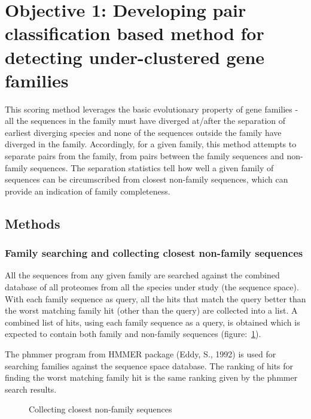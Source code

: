 \documentclass{article}
\begin{document}
	\section{Objective 1: Developing pair classification based method for detecting under-clustered gene families} 
	This scoring method leverages the basic evolutionary property of gene families - all the sequences in the family must have diverged at/after the separation of earliest diverging species and none of the sequences outside the family have diverged in the family. Accordingly, for a given family, this method attempts to separate pairs from the family, from pairs between the family sequences and non-family sequences. The separation statistics tell how well a given family of sequences can be circumscribed from closest non-family sequences, which can provide an indication of family completeness.
		\subsection{Methods}
			\subsubsection{Family searching and collecting closest non-family sequences}
			All the sequences from any given family are searched against the combined database of all proteomes from all the species under study (the sequence space). With each family sequence as query, all the hits that match the query better than the worst matching family hit (other than the query) are collected into a list. A combined list of hits, using each family sequence as a query, is obtained which is expected to contain both family and non-family sequences (figure:~\ref{fig:collecting_non_fam_seqs}).
			
			The phmmer program from HMMER package (Eddy, S., 1992) is used for searching families against the sequence space database. The ranking of hits for finding the worst matching family hit is the same ranking given by the phmmer search results. 
			\begin{figure}
				\caption{Collecting closest non-family sequences}
				\label{fig:collecting_non_fam_seqs}
			\end{figure}
			
\end{document}
